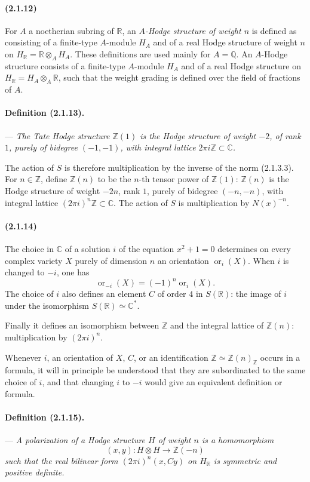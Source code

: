 \documentclass[10pt]{article}
\newcommand{\C}{\mathbb C}
\newcommand{\Q}{\mathbb Q}
\newcommand{\Z}{\mathbb Z}
\newcommand{\R}{\mathbb R}
\newcommand{\ornt}{\operatorname{or}}
\begin{document}
\paragraph{(2.1.12)} For $A$ a noetherian subring of $\R$, an \emph{$A$-Hodge structure of weight $n$} is defined as consisting of a finite-type $A$-module $H_A$ and of a real Hodge structure of weight $n$ on $H_\R=\R\otimes_AH_A$. These definitions are used mainly for $A=\Q$. An $A$-Hodge structure consists of a finite-type $A$-module $H_A$ and of a real Hodge structure on $H_\R=H_A\otimes_A\R$, such that the weight grading is defined over the field of fractions of $A$.

\paragraph{Definition (2.1.13).} --- \emph{The Tate Hodge structure $\Z(1)$ is the Hodge structure of weight $-2$, of rank $1$, purely of bidegree $(-1,-1)$, with integral lattice $2\pi i\Z\subset\C$.}

The action of $S$ is therefore multiplication by the inverse of the norm (2.1.3.3). For $n\in\Z$, define $\Z(n)$ to be the $n$-th tensor power of $\Z(1)$: $\Z(n)$ is the Hodge structure of weight $-2n$, rank $1$, purely of bidegree $(-n,-n)$, with integral lattice $(2\pi i)^n\Z\subset\C$. The action of $S$ is multiplication by $N(x)^{-n}$.

\paragraph{(2.1.14)} The choice in $\C$ of a solution $i$ of the equation $x^2+1=0$ determines on every complex variety $X$ purely of dimension $n$ an orientation $\ornt_i(X)$. When $i$ is changed to $-i$, one has
\[
\ornt_{-i}(X)=(-1)^n\ornt_i(X).
\]
The choice of $i$ also defines an element $C$ of order $4$ in $S(\R)$: the image of $i$ under the isomorphism $S(\R)\simeq\C^*$.

Finally it defines an isomorphism between $\Z$ and the integral lattice of $\Z(n)$: multiplication by $(2\pi i)^n$.

Whenever $i$, an orientation of $X$, $C$, or an identification $\Z\simeq\Z(n)_\Z$ occurs in a formula, it will in principle be understood that they are subordinated to the same choice of $i$, and that changing $i$ to $-i$ would give an equivalent definition or formula.

\paragraph{Definition (2.1.15).} --- {\itshape A polarization of a Hodge structure $H$ of weight $n$ is a homomorphism
\[
(x,y):H\otimes H\longrightarrow\Z(-n)
\]
such that the real bilinear form $(2\pi i)^n(x,Cy)$ on $H_\R$ is symmetric and positive definite.}
\end{document}

